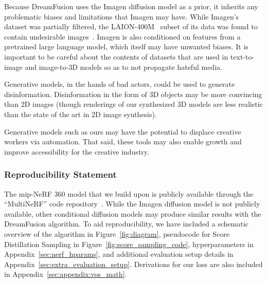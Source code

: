 \documentclass{article} %
\newcommand{\sname}{Score Distillation Sampling\xspace}
\newcommand{\dreamfusion}{DreamFusion\xspace}
\begin{document}
Because \dreamfusion uses the Imagen diffusion model as a prior, it inherits any problematic biases and limitations that Imagen may have. While Imagen's dataset was partially filtered, the LAION-400M~\citep{laion5b} subset of its data was found to contain undesirable images~\citep{multimodaldatasets}. Imagen is also conditioned on features from a pretrained large language model, which itself may have unwanted biases. It is important to be careful about the contents of datasets that are used in text-to-image and image-to-3D models so as to not propagate hateful media.

Generative models, in the hands of bad actors, could be used to generate disinformation. Disinformation in the form of 3D objects may be more convincing than 2D images (though renderings of our synthesized 3D models are less realistic than the state of the art in 2D image synthesis).


Generative models such as ours may have the potential to displace creative workers via automation. That said, these tools may also enable growth and improve accessibility for the creative industry.%

\subsubsection*{Reproducibility Statement}

The mip-NeRF 360 model that we build upon is publicly available through the ``MultiNeRF'' code repository~\citep{multinerf2022}. While the Imagen diffusion model is not publicly available, other conditional diffusion models may produce similar results with the \dreamfusion algorithm. To aid reproducibility, we have included a schematic overview of the algorithm in Figure~\ref{fig:diagram}, pseudocode for \sname in Figure~\ref{fig:score_sampling_code}, hyperparameters in Appendix~\ref{sec:nerf_hparams}, and additional evaluation setup details in Appendix~\ref{sec:extra_evaluation_setup}. Derivations for our loss are also included in Appendix~\ref{sec:appendix:vos_math}.
\end{document}
